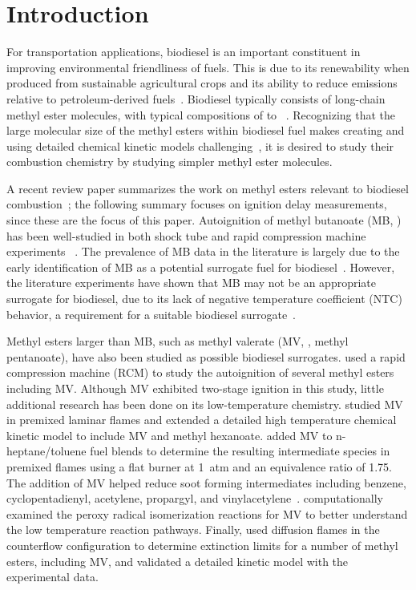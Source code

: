 \documentclass[letterpaper, review, sort&compress]{elsarticle}
\begin{document}

\linenumbers

\section{Introduction}\label{sec:introduction}

For transportation applications, biodiesel is an important constituent in improving environmental
friendliness of fuels. This is due to its renewability when produced from sustainable agricultural
crops and its ability to reduce emissions relative to petroleum-derived fuels~\cite{Hoekman2012}.
Biodiesel typically consists of long-chain methyl ester molecules, with typical compositions of
 to ~\cite{Hoekman2012}. Recognizing that the large molecular size of the methyl
esters within biodiesel fuel makes creating and using detailed chemical kinetic models
challenging~\cite{Lai2011}, it is desired to study their combustion chemistry by studying simpler
methyl ester molecules.

A recent review paper summarizes the work on methyl esters relevant to biodiesel
combustion~\cite{Coniglio2013}; the following summary focuses on ignition delay measurements, since
these are the focus of this paper. Autoignition of methyl butanoate (MB, ) has been
well-studied in both shock tube and rapid compression machine experiments~
\cite{Metcalfe2007,Walton2009,Dooley2008,Akih-Kumgeh2010,Akih-Kumgeh2011,Hadj-Ali2009,Kumar2016}.
The prevalence of MB data in the literature is largely due to the early identification of MB as a
potential surrogate fuel for biodiesel~\cite{Fisher2000}. However, the literature experiments have
shown that MB may not be an appropriate surrogate for biodiesel, due to its lack of negative
temperature coefficient (NTC) behavior, a requirement for a suitable biodiesel
surrogate~\cite{Coniglio2013}.

Methyl esters larger than MB, such as methyl valerate (MV, , methyl pentanoate), have
also been studied as possible biodiesel surrogates. \citet{Hadj-Ali2009} used a rapid compression
machine (RCM) to study the autoignition of several methyl esters including MV. Although MV exhibited
two-stage ignition in this study, little additional research has been done on its low-temperature
chemistry. \citet{Korobeinichev2015} studied MV in premixed laminar flames and extended a detailed
high temperature chemical kinetic model to include MV and methyl hexanoate. \citet{Dmitriev2015}
added MV to n-heptane/toluene fuel blends to determine the resulting intermediate species in
premixed flames using a flat burner at \SI{1}{atm} and an equivalence ratio of 1.75. The addition of
MV helped reduce soot forming intermediates including benzene, cyclopentadienyl, acetylene,
propargyl, and vinylacetylene~\cite{Dmitriev2015}. \citet{Hayes2009} computationally examined the
peroxy radical isomerization reactions for MV to better understand the low temperature reaction
pathways. Finally, \citet{Dievart2013} used diffusion flames in the counterflow configuration to
determine extinction limits for a number of methyl esters, including MV, and validated a detailed
kinetic model with the experimental data.
\end{document}
